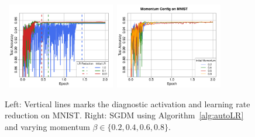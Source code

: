 \documentclass[conference]{IEEEtran}
\begin{document}
\begin{figure}[h!]
\mbox{\hspace{-0.1in}
  \includegraphics[width=1.85in]{fig/RFig1_LR_notitle.pdf}\hspace{-0.12in}
\includegraphics[width=1.85in]{fig/RFig2_AltMom.pdf}
}
\vspace{-0.16in}
  \caption{Left: Vertical lines marks the diagnostic activation and learning rate reduction on MNIST.
  Right: SGDM using Algorithm~\ref{alg:autoLR} and varying momentum $\beta\in\{0.2, 0.4, 0.6, 0.8\}$.
  }
\label{fig:mnistactivate_momvary}
\end{figure}
\end{document}
